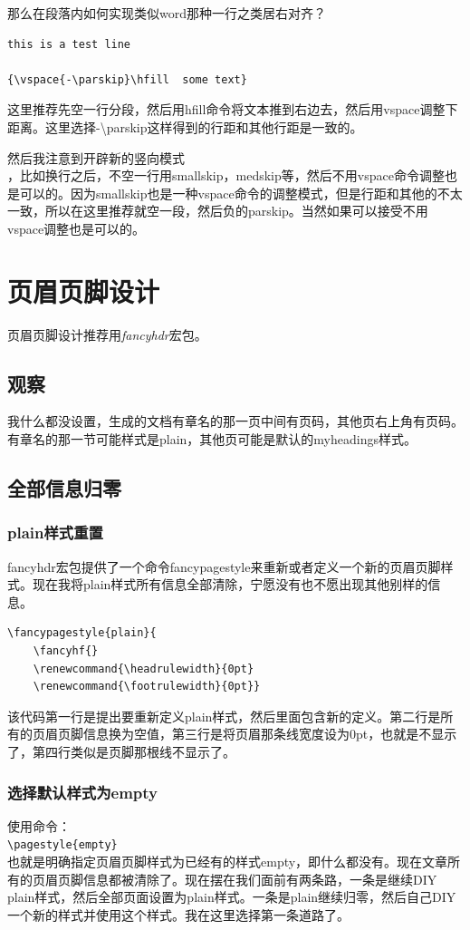 \documentclass[11pt,oneside]{book}
\begin{document}
那么在段落内如何实现类似word那种一行之类居右对齐？

\begin{Verbatim}
this is a test line

{\vspace{-\parskip}\hfill  some text}
\end{Verbatim}

这里推荐先空一行分段，然后用hfill命令将文本推到右边去，然后用vspace调整下距离。这里选择-\textbackslash parskip这样得到的行距和其他行距是一致的。

{\vspace{-\parskip}\hfill  然后我注意到开辟新的竖向模式}\\，比如换行之后，不空一行用smallskip，medskip等，然后不用vspace命令调整也是可以的。因为smallskip也是一种vspace命令的调整模式，但是行距和其他的不太一致，所以在这里推荐就空一段，然后负的parskip。当然如果可以接受不用vspace调整也是可以的。



\chapter{页眉页脚设计}
页眉页脚设计推荐用\emph{fancyhdr}宏包。
\section{观察}
我什么都没设置，生成的文档有章名的那一页中间有页码，其他页右上角有页码。有章名的那一节可能样式是plain，其他页可能是默认的myheadings样式。

\section{全部信息归零}
\subsection{plain样式重置}
fancyhdr宏包提供了一个命令fancypagestyle来重新或者定义一个新的页眉页脚样式。现在我将plain样式所有信息全部清除，宁愿没有也不愿出现其他别样的信息。
\begin{Verbatim}
\fancypagestyle{plain}{
    \fancyhf{}
    \renewcommand{\headrulewidth}{0pt}
    \renewcommand{\footrulewidth}{0pt}}
\end{Verbatim}
该代码第一行是提出要重新定义plain样式，然后里面包含新的定义。第二行是所有的页眉页脚信息换为空值，第三行是将页眉那条线宽度设为0pt，也就是不显示了，第四行类似是页脚那根线不显示了。

\subsection{选择默认样式为empty}
使用命令：\\
\verb+\pagestyle{empty}+\\
也就是明确指定页眉页脚样式为已经有的样式empty，即什么都没有。现在文章所有的页眉页脚信息都被清除了。现在摆在我们面前有两条路，一条是继续DIY plain样式，然后全部页面设置为plain样式。一条是plain继续归零，然后自己DIY一个新的样式并使用这个样式。我在这里选择第一条道路了。
\end{document}
